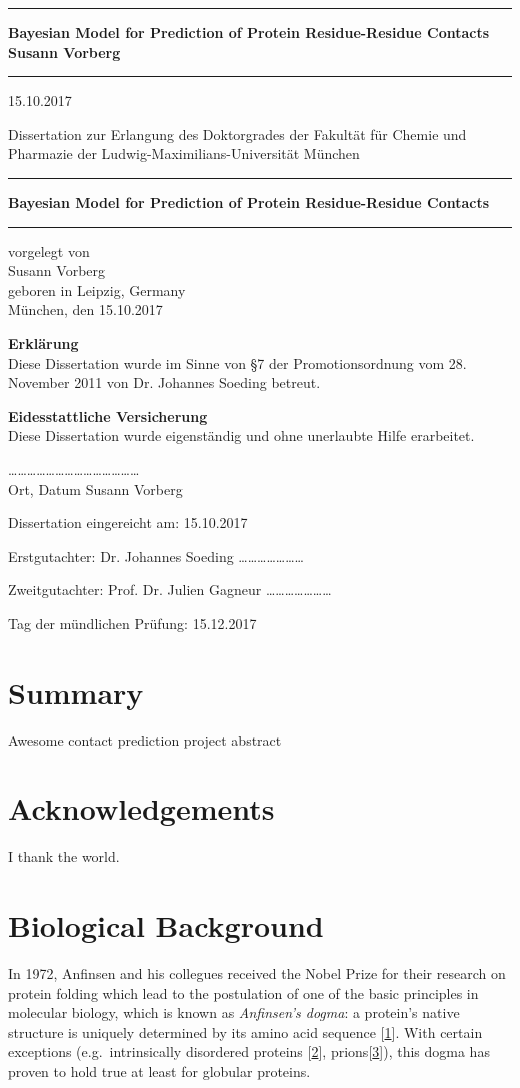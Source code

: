 \documentclass[11pt,a4paper,twoside]{book}
\newcommand{\LMUCover}[3]{
    \thispagestyle{empty}
    {\parindent0cm \rule{\linewidth}{.7ex}}
    
    \begin{flushright}
      \vspace*{\stretch{1}}
      \sffamily\bfseries\Huge
      #1\\
      \vspace*{\stretch{1}}
      \sffamily\bfseries\large
      #2
      \vspace*{\stretch{1}}
    \end{flushright}
  
    \rule{\linewidth}{.7ex}
    \vspace*{\stretch{5}}
    \vspace*{\stretch{1}}
    
    \begin{center}\sffamily\LARGE{#3}\end{center}
}
\newcommand{\LMUTitlePage}[4]{
    \thispagestyle{empty}
    \vspace*{\stretch{1}}
    
    \begin{center}
      \Large Dissertation zur Erlangung des Doktorgrades der Fakultät für Chemie und Pharmazie der Ludwig-Maximilians-Universität München
    \end{center}
    
    \vspace*{\stretch{1}}
    {\parindent0cm \rule{\linewidth}{.7ex}}
    
    \begin{flushright}
      \vspace*{\stretch{1}}
      \sffamily\bfseries\Huge
      #1\\
      \vspace*{\stretch{1}}
    \end{flushright}
  
    \rule{\linewidth}{.7ex}

    \vspace*{\stretch{3}}
    \begin{center}
      \Large vorgelegt von\\
      \Large #2\\
      \Large geboren in #3\\
      \vspace*{\stretch{2}}
      \Large München, den #4
    \end{center}
}
\newcommand{\LMUErklaerung}[5]{
    \thispagestyle{empty}
    \begin{flushleft}
      \large \textbf{Erklärung} \\[1mm]
      \large Diese Dissertation wurde im Sinne von §7 der Promotionsordnung vom 28. November 2011 von #2 betreut.
      \bigskip
  
      \large \textbf{Eidesstattliche Versicherung}\\[1mm]
      \large Diese Dissertation wurde eigenständig und ohne unerlaubte Hilfe erarbeitet.
      \vspace{5em}
  
      \dots\dots\dots   \dots\dots\dots \hfill \dots\dots\dots\dots\dots\dots\dots\dots\\
      \large Ort, Datum \hfill #1
      \vfill
  
  
      \large Dissertation eingereicht am: \hfill #4
      \bigskip
    
      \large Erstgutachter:  #2 \hfill \dots\dots\dots\dots\dots\dots\dots
      \bigskip
    
      \large Zweitgutachter: #3 \hfill \dots\dots\dots\dots\dots\dots\dots
      \bigskip
    
      \large Tag der mündlichen Prüfung: \hfill #5
    \end{flushleft}
}
\theoremstyle{definition}
\theoremstyle{definition}
\theoremstyle{remark}
\begin{document}
\frontmatter

\LMUCover
	{Bayesian Model for Prediction of Protein Residue-Residue Contacts}
	{Susann Vorberg}
	{15.10.2017}

\newpage
\thispagestyle{empty}
\cleardoublepage

\LMUTitlePage
	{Bayesian Model for Prediction of Protein Residue-Residue Contacts}
	{Susann Vorberg}
	{Leipzig, Germany}
	{15.10.2017}

\newpage
\thispagestyle{empty}
\cleardoublepage

\LMUErklaerung
	{Susann Vorberg}
	{Dr. Johannes Soeding}
	{Prof. Dr. Julien Gagneur}
	{15.10.2017}
	{15.12.2017}

\newpage
\thispagestyle{empty}
\cleardoublepage
\frontmatter\setcounter{page}{1}

\chapter*{Summary}\label{summary}

Awesome contact prediction project abstract

\chapter*{Acknowledgements}\label{acknowledgements}

I thank the world.

\tableofcontents
{}

\mainmatter \setcounter{page}{1}

\chapter{Biological Background}\label{general-intro}

In 1972, Anfinsen and his collegues received the Nobel Prize for their
research on protein folding which lead to the postulation of one of the
basic principles in molecular biology, which is known as
\emph{Anfinsen's dogma}: a protein's native structure is uniquely
determined by its amino acid sequence
{[}\protect\hyperlink{ref-Anfinsen1973}{1}{]}. With certain exceptions
(e.g.~intrinsically disordered proteins
{[}\protect\hyperlink{ref-Wright1999}{2}{]},
prions{[}\protect\hyperlink{ref-Fraser2014}{3}{]}), this dogma has
proven to hold true at least for globular proteins.
\end{document}
